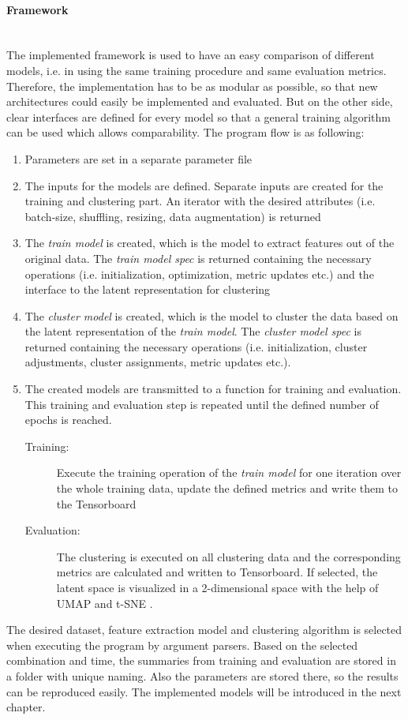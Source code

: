 \documentclass[12pt,DIV14,BCOR12mm,a4paper,footexclude,headinclude,halfparskip-,twoside,openright,openany,cleardoubleempty,idxtotoc,bibtotoc]{scrreprt} %
\numberwithin{equation}{chapter}
\begin{document}
\paragraph{Framework}\mbox{}\\
The implemented framework is used to have an easy comparison of different models, i.e. in using the same training procedure and same evaluation metrics. Therefore, the implementation has to be as modular as possible, so that new architectures could easily be implemented and evaluated. But on the other side, clear interfaces are defined for every model so that a general training algorithm can be used which allows comparability. The program flow is as following:
\begin{enumerate}
	\item Parameters are set in a separate parameter file
	\item The inputs for the models are defined. Separate inputs are created for the training and clustering part. An iterator with the desired attributes (i.e. batch-size, shuffling, resizing, data augmentation) is returned 
	\item The \textit{train model} is created, which is the model to extract features out of the original data. The \textit{train model spec} is returned containing the necessary operations (i.e. initialization, optimization, metric updates etc.) and the interface to the latent representation for clustering
	\item The \textit{cluster model} is created, which is the model to cluster the data based on the latent representation of the \textit{train model}. The \textit{cluster model spec} is returned containing the necessary operations (i.e. initialization, cluster adjustments, cluster assignments, metric updates etc.).
	\item The created models are transmitted to a function for training and evaluation. This training and evaluation step is repeated until the defined number of epochs is reached.
		\begin{description}
			\item[Training:] Execute the training operation of the \textit{train model} for one iteration over the whole training data, update the defined metrics and write them to the Tensorboard
			\item[Evaluation:] The clustering is executed on all clustering data and the corresponding metrics are calculated and written to Tensorboard. If selected, the latent space is visualized in a 2-dimensional space with the help of UMAP \cite{mcinnes2018umap-software} and t-SNE \cite{t-SNE}.			
		\end{description}
\end{enumerate}
The desired dataset, feature extraction model and clustering algorithm is selected when executing the program by argument parsers. Based on the selected combination and time, the summaries from training and evaluation are stored in a folder with unique naming. Also the parameters are stored there, so the results can be reproduced easily. The implemented models will be introduced in the next chapter.
\end{document}
